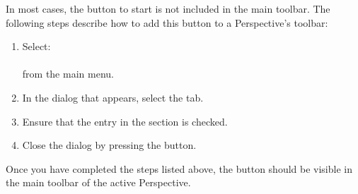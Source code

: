 In most cases, the button to start \gdauts{} is not included in the main 
toolbar. The following steps describe how to add this button to a 
Perspective's toolbar:
\begin{enumerate}
\item{Select: \\
\\
from the main menu.} 
\item{In the dialog that appears, select the  tab.}
\item{Ensure that the entry  in the section 
     is checked.}
\item{Close the dialog by pressing the  button.}
\end{enumerate}

Once you have completed the steps listed above, the  button 
should be visible in the main toolbar of the active Perspective.
